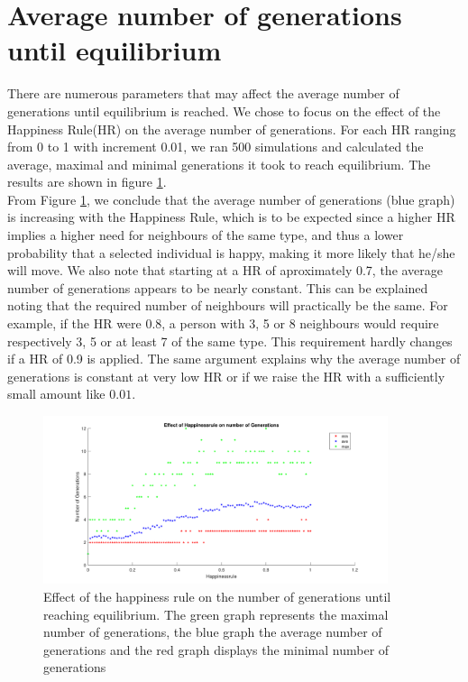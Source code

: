 
\section{Average number of generations until equilibrium}\label{sec:aantgen}
There are numerous parameters that may affect the average number of generations until  equilibrium is reached. 
We chose to focus on the effect of the Happiness Rule(HR) on the average number of generations. 
For each HR ranging from 0 to 1 with increment 0.01, we ran 500 simulations and calculated the average, maximal and minimal generations it took to reach equilibrium. 
The results are shown in figure \ref{fig:avegen}.\\

From Figure \ref{fig:avegen}, we conclude that the average number of generations (blue graph) is increasing with the Happiness Rule, which is to be expected since a higher HR implies a higher need for neighbours of the same type, and thus a lower probability that a selected individual is happy, making it more likely that he/she will move. 
We also note that starting at a HR of aproximately 0.7, the average number of generations appears to be nearly constant. 
This can be explained noting that the required number of neighbours will practically be the same. 
For example, if the HR were 0.8, a person with 3, 5 or 8 neighbours would require respectively 3, 5 or at least 7 of the same type. 
This requirement hardly changes if a HR of 0.9 is applied. 
The same argument explains why the average number of generations is constant at very low HR or if we raise the HR with a sufficiently small amount like $0.01$.

\begin{figure}[h!]
    \centering
    \includegraphics[width=0.9\textwidth]{happinessregel_aantgen_2.pdf}
    \caption{Effect of the happiness rule on the number of generations until reaching equilibrium. 
    The green graph represents the maximal number of generations, the blue graph the average number of generations and the red graph displays the minimal number of generations}
    \label{fig:avegen}
\end{figure}

